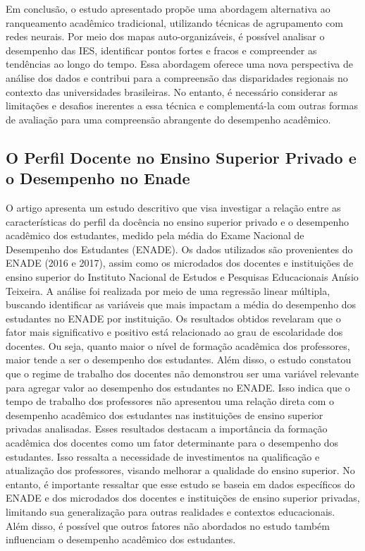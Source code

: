 \documentclass[conference]{IEEEtran}
\begin{document}
Em conclusão, o estudo apresentado propõe uma abordagem alternativa ao ranqueamento acadêmico tradicional, utilizando técnicas de agrupamento com redes neurais. Por meio dos mapas auto-organizáveis, é possível analisar o desempenho das IES, identificar pontos fortes e fracos e compreender as tendências ao longo do tempo. Essa abordagem oferece uma nova perspectiva de análise dos dados e contribui para a compreensão das disparidades regionais no contexto das universidades brasileiras. No entanto, é necessário considerar as limitações e desafios inerentes a essa técnica e complementá-la com outras formas de avaliação para uma compreensão abrangente do desempenho acadêmico.


\subsection{O Perfil Docente no Ensino Superior Privado e o Desempenho no Enade\cite{b5}}
O artigo apresenta um estudo descritivo que visa investigar a relação entre as características do perfil da docência no ensino superior privado e o desempenho acadêmico dos estudantes, medido pela média do Exame Nacional de Desempenho dos Estudantes (ENADE). Os dados utilizados são provenientes do ENADE (2016 e 2017), assim como os microdados dos docentes e instituições de ensino superior do Instituto Nacional de Estudos e Pesquisas Educacionais Anísio Teixeira.
A análise foi realizada por meio de uma regressão linear múltipla, buscando identificar as variáveis que mais impactam a média do desempenho dos estudantes no ENADE por instituição. Os resultados obtidos revelaram que o fator mais significativo e positivo está relacionado ao grau de escolaridade dos docentes. Ou seja, quanto maior o nível de formação acadêmica dos professores, maior tende a ser o desempenho dos estudantes.
Além disso, o estudo constatou que o regime de trabalho dos docentes não demonstrou ser uma variável relevante para agregar valor ao desempenho dos estudantes no ENADE. Isso indica que o tempo de trabalho dos professores não apresentou uma relação direta com o desempenho acadêmico dos estudantes nas instituições de ensino superior privadas analisadas.
Esses resultados destacam a importância da formação acadêmica dos docentes como um fator determinante para o desempenho dos estudantes. Isso ressalta a necessidade de investimentos na qualificação e atualização dos professores, visando melhorar a qualidade do ensino superior.
No entanto, é importante ressaltar que esse estudo se baseia em dados específicos do ENADE e dos microdados dos docentes e instituições de ensino superior privadas, limitando sua generalização para outras realidades e contextos educacionais. Além disso, é possível que outros fatores não abordados no estudo também influenciam o desempenho acadêmico dos estudantes.
\end{document}
